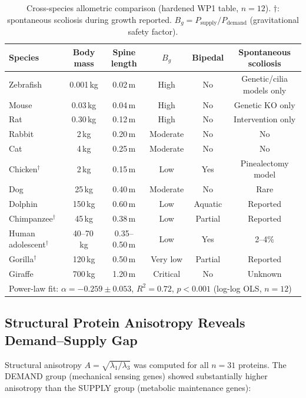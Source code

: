 \documentclass[12pt, letterpaper]{article}
\begin{document}
\begin{table}[H]
  \centering
  \caption{Cross-species allometric comparison (hardened WP1 table, $n=12$).
    $\dagger$: spontaneous scoliosis during growth reported.
    $B_g = P_{\mathrm{supply}}/P_{\mathrm{demand}}$ (gravitational safety factor).}
  \label{tab:species}
  \renewcommand{\arraystretch}{1.25}
  \begin{tabular}{lccccc}
    \toprule
    Species & Body mass & Spine length & $B_g$ & Bipedal & Spontaneous scoliosis \\
    \midrule
    Zebrafish & 0.001\,kg & 0.02\,m & High & No & Genetic/cilia models only \\
    Mouse & 0.03\,kg & 0.04\,m & High & No & Genetic KO only \\
    Rat & 0.30\,kg & 0.12\,m & High & No & Intervention only \\
    Rabbit & 2\,kg & 0.20\,m & Moderate & No & No \\
    Cat & 4\,kg & 0.25\,m & Moderate & No & No \\
    Chicken$^\dagger$ & 2\,kg & 0.15\,m & Low & Yes & Pinealectomy model \\
    Dog & 25\,kg & 0.40\,m & Moderate & No & Rare \\
    Dolphin & 150\,kg & 0.60\,m & Low & Aquatic & Reported \\
    Chimpanzee$^\dagger$ & 45\,kg & 0.38\,m & Low & Partial & Reported \\
    Human adolescent$^\dagger$ & 40--70\,kg & 0.35--0.50\,m & Low & Yes & 2--4\% \\
    Gorilla$^\dagger$ & 120\,kg & 0.50\,m & Very low & Partial & Reported \\
    Giraffe & 700\,kg & 1.20\,m & Critical & No & Unknown \\
    \bottomrule
    \multicolumn{6}{l}{\small Power-law fit: $\alpha = -0.259 \pm 0.053$,
      $R^{2} = 0.72$, $p < 0.001$ (log-log OLS, $n=12$)} \\
  \end{tabular}
\end{table}

\subsection{Structural Protein Anisotropy Reveals Demand--Supply Gap}

Structural anisotropy $A = \sqrt{\lambda_1/\lambda_3}$ was computed for all
$n=31$ proteins. The DEMAND group (mechanical sensing genes) showed substantially
higher anisotropy than the SUPPLY group (metabolic maintenance genes):
\end{document}
